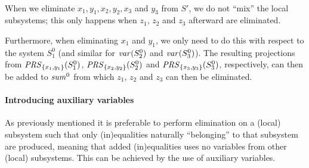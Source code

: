 \begin{example}
\begin{gather*}
\end{gather*}
When we eliminate $x_1, y_1, x_2, y_2, x_3$ and $y_3$ from $S'$, we do not ``mix'' the local subsystems; this only happens when $z_1$, $z_2$ and $z_3$ 
 afterward are eliminated. 

Furthermore, when eliminating $x_1$ and $y_1$, we only need to do this with respect to the system $S^0_1$ (and similar for $\mathit{var}(S^0_2)$ and $\mathit{var}(S^0_3)$). The resulting projections from $\mathit{PRS}_{\{x_1, y_1\}}(S^0_1)$, $\mathit{PRS}_{\{x_2, y_2\}}(S^0_2)$ and $\mathit{PRS}_{\{x_3, y_3\}}(S^0_3)$, respectively, can then be added to $\mathit{sum}^0$ %
from which $z_1$, $z_2$ and $z_3$ 
can then be eliminated. %
\end{example}

\paragraph{Introducing auxiliary variables}
As previously mentioned it is preferable to perform elimination on a (local) subsystem such that only (in)equalities naturally ``belonging'' to that subsystem are produced, meaning that added (in)equalities uses no variables from other (local) subsystems. 
This can be achieved by the use of auxiliary variables.


